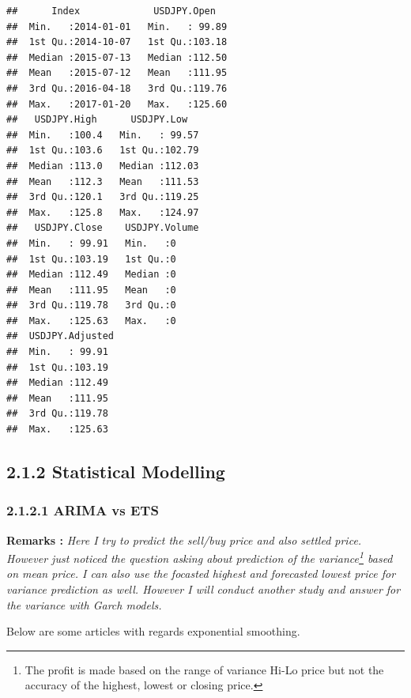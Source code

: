 \documentclass[]{tufte-book}
\begin{document}
\begin{verbatim}
##      Index             USDJPY.Open    
##  Min.   :2014-01-01   Min.   : 99.89  
##  1st Qu.:2014-10-07   1st Qu.:103.18  
##  Median :2015-07-13   Median :112.50  
##  Mean   :2015-07-12   Mean   :111.95  
##  3rd Qu.:2016-04-18   3rd Qu.:119.76  
##  Max.   :2017-01-20   Max.   :125.60  
##   USDJPY.High      USDJPY.Low    
##  Min.   :100.4   Min.   : 99.57  
##  1st Qu.:103.6   1st Qu.:102.79  
##  Median :113.0   Median :112.03  
##  Mean   :112.3   Mean   :111.53  
##  3rd Qu.:120.1   3rd Qu.:119.25  
##  Max.   :125.8   Max.   :124.97  
##   USDJPY.Close    USDJPY.Volume
##  Min.   : 99.91   Min.   :0    
##  1st Qu.:103.19   1st Qu.:0    
##  Median :112.49   Median :0    
##  Mean   :111.95   Mean   :0    
##  3rd Qu.:119.78   3rd Qu.:0    
##  Max.   :125.63   Max.   :0    
##  USDJPY.Adjusted 
##  Min.   : 99.91  
##  1st Qu.:103.19  
##  Median :112.49  
##  Mean   :111.95  
##  3rd Qu.:119.78  
##  Max.   :125.63
\end{verbatim}

\subsection{2.1.2 Statistical Modelling}\label{statistical-modelling}

\subsubsection{2.1.2.1 ARIMA vs ETS}\label{arima-vs-ets}

{\textbf{Remarks :} \emph{Here I try to predict the sell/buy price and
also settled price. However just noticed the question asking about
prediction of the variance\footnote{The profit is made based on the
  range of variance Hi-Lo price but not the accuracy of the highest,
  lowest or closing price.} based on mean price. I can also use the
focasted highest and forecasted lowest price for variance prediction as
well. However I will conduct another study and answer for the variance
with Garch models.}}

Below are some articles with regards exponential smoothing.
\end{document}
